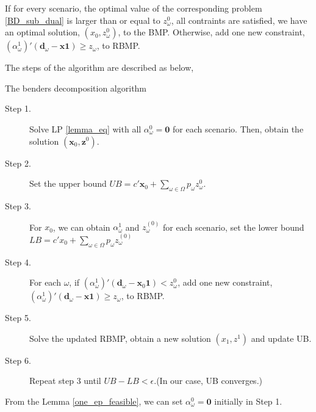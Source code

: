 If for every scenario, the optimal value of the corresponding problem \eqref{BD_sub_dual} is larger than or equal to $z_{\omega}^{0}$, all contraints are satisfied, we have an optimal solution, $(x_0, z_{\omega}^{0})$, to the BMP. Otherwise, add one new constraint, $(\alpha_{\omega}^{1}){'}(\mathbf{d}_{\omega}- \mathbf{x} \mathbf{1}) \geq z_{\omega}$, to RBMP.


 


The steps of the algorithm are described as below,

\begin{algorithm}[H]\label{cut_algo}
  \caption{The benders decomposition algorithm}
    \begin{description}
    \item[Step 1.] Solve LP \eqref{lemma_eq} with all $\alpha_{\omega}^0 = \mathbf{0}$ for each scenario.
    Then, obtain the solution $(\mathbf{x}_0, \mathbf{z}^{0})$.

    \item[Step 2.] Set the upper bound $UB = c{'} \mathbf{x}_0 + \sum_{\omega \in \Omega} p_{\omega} z_{\omega}^{0}$.
    \item[Step 3.] 
    For $x_0$, we can obtain $\alpha_{\omega}^{1}$ and $z_{\omega}^{(0)}$ for each scenario, set the lower bound $LB = c{'} x_0 + \sum_{\omega \in \Omega} p_{\omega} z_{\omega}^{(0)}$
    \item[Step 4.]
    For each $\omega$, if $(\alpha_{\omega}^{1}){'}(\mathbf{d}_{\omega}- \mathbf{x}_0 \mathbf{1}) < z_{\omega}^{0}$, add one new constraint, $(\alpha_{\omega}^{1}){'}(\mathbf{d}_{\omega}- \mathbf{x} \mathbf{1}) \geq z_{\omega}$, to RBMP.
    \item[Step 5.] Solve the updated RBMP, obtain a new solution $(x_1, z^{1})$ and update UB.
    \item[Step 6.] Repeat step 3 until $UB - LB < \epsilon$.(In our case, UB converges.)
   \end{description}
  \end{algorithm}

\begin{remark}
From the Lemma \ref{one_ep_feasible}, we can set $\alpha_{\omega}^0 = \mathbf{0}$ initially in Step 1. 
\end{remark}

